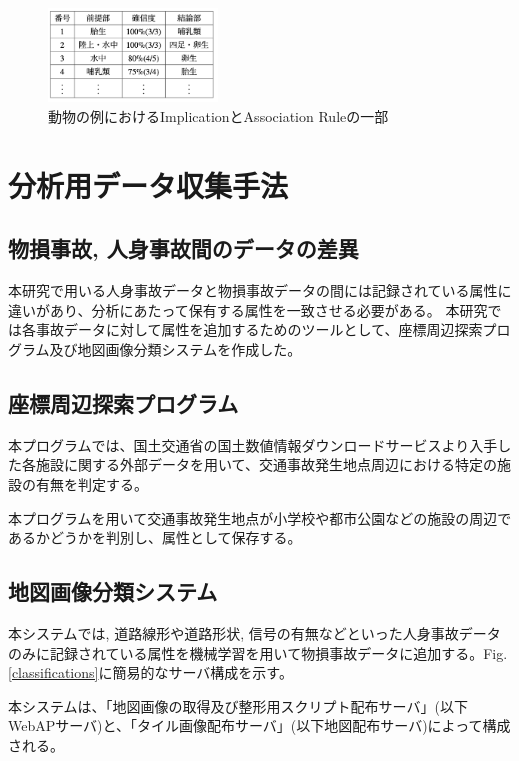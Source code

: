 \documentclass[a4j,8.5pt, twocolumn,fleqn]{jbook}
\begin{document}
\begin{figure}[htb]
    \centering
    \includegraphics[height=25mm]{images/implication.png}
    \vspace{-6mm}
    \caption{動物の例におけるImplicationとAssociation Ruleの一部}
    \label{implications}
\end{figure}


\section{分析用データ収集手法}
\subsection{物損事故, 人身事故間のデータの差異}
本研究で用いる人身事故データと物損事故データの間には記録されている属性に違いがあり、分析にあたって保有する属性を一致させる必要がある。
本研究では各事故データに対して属性を追加するためのツールとして、座標周辺探索プログラム及び地図画像分類システムを作成した。

\subsection{座標周辺探索プログラム}
本プログラムでは、国土交通省の国土数値情報ダウンロードサービス\cite{国土数値情報ダウンロードサービス}より入手した各施設に関する外部データを用いて、交通事故発生地点周辺における特定の施設の有無を判定する。

本プログラムを用いて交通事故発生地点が小学校や都市公園などの施設の周辺であるかどうかを判別し、属性として保存する。

\subsection{地図画像分類システム}
本システムでは, 道路線形や道路形状, 信号の有無などといった人身事故データのみに記録されている属性を機械学習を用いて物損事故データに追加する。Fig.\ref{classifications}に簡易的なサーバ構成を示す。

本システムは、「地図画像の取得及び整形用スクリプト配布サーバ」(以下WebAPサーバ)と、「タイル画像配布サーバ」(以下地図配布サーバ)によって構成される。
\end{document}
